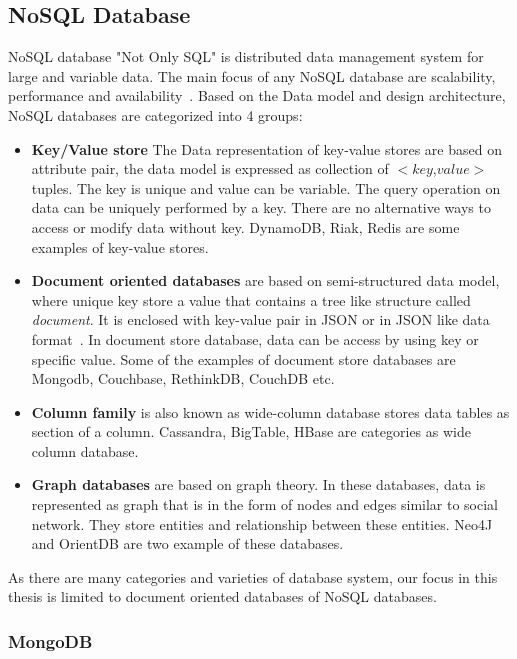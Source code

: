 \documentclass[a4paper,12pt]{article}
\begin{document}
	\subsection{NoSQL Database}
	NoSQL database "Not Only SQL" is distributed data management system for large and variable data. The main focus of any NoSQL database are scalability, performance and availability~\citep{hecht2011nosql}.
	Based on the Data model and design architecture, NoSQL databases are categorized into 4 groups:
	\begin{itemize}
		\item \textbf{Key/Value store}
		The Data representation of key-value stores are based on attribute pair, the data model is expressed as collection of $<$$key$,$value$$>$ tuples. The key is unique and value can be variable. The query operation on data can be uniquely performed by a key. There are no alternative ways to access or modify data without key.  DynamoDB, Riak, Redis are some examples of key-value stores.
		\item \textbf{Document oriented databases} are based on semi-structured data model, where unique key store a value that contains a tree like structure called \textit{document}. It is enclosed with key-value pair in JSON or in JSON like data format~\citep{hecht2011nosql}. In document store database, data can be access by using key or specific value. Some of the examples of document store databases are Mongodb, Couchbase, RethinkDB, CouchDB etc.
		\item \textbf{Column family} is also known as wide-column database stores data tables as section of a column. Cassandra, BigTable, HBase are categories as wide column database.
		\item \textbf{Graph databases} are based on graph theory. In these databases, data is represented as graph that is in the form of nodes and edges similar to social network. They store entities and relationship between these entities. Neo4J and OrientDB are two example of these databases.
	\end{itemize}
	As there are many categories and varieties of database system, our focus in this thesis is limited to document oriented databases of NoSQL databases.
	\subsubsection{MongoDB}
		
\end{document}
